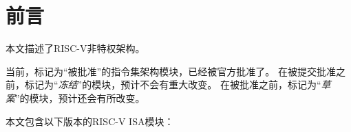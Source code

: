 \chapter{前言}


本文描述了RISC-V非特权架构。


当前，标记为“被批准”的指令集架构模块，已经被官方批准了。
在被提交批准之前，标记为“{\em 冻结}”的模块，预计不会有重大改变。
在被批准之前，标记为“{\em 草案}”的模块，预计还会有所改变。


本文包含以下版本的RISC-V ISA模块：

